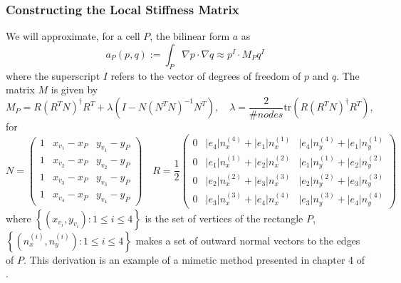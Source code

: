 \subsubsection{Constructing the Local Stiffness Matrix}\label{Sec:NumericalScheme}
We will approximate, for a cell $P$, the bilinear form $a$ as
%
\begin{equation}
	a_P(p,q):=\int_P\nabla p\cdot\nabla q \approx p^I\cdot M_P q^I
\end{equation}
%
where the superscript $I$ refers to the vector of degrees of freedom of $p$ and $q$. The matrix $M$ is given by
%
\begin{equation}\label{eq:LocStiffnessMat}
	M_P = R(R^TN)^{\dagger}R^T+\lambda (I-N(N^TN)^{-1}N^T),\quad\lambda = \frac{2}{\# nodes}\mbox{tr}\left( R(R^TN)^{\dagger}R^T\right),
\end{equation}
%
for 
%
\begin{equation}\label{eq:NandR}
	N = \begin{pmatrix}
		1 & x_{v_1}-x_P & y_{v_1}-y_P\\ 
		1 & x_{v_2}-x_P & y_{v_2}-y_P\\ 
		1 & x_{v_3}-x_P & y_{v_3}-y_P\\ 
		1 & x_{v_4}-x_P & y_{v_4}-y_P
	\end{pmatrix}\quad
	R = \frac{1}{2}\begin{pmatrix}
		0 & |e_4| n_x^{(4)}+|e_1|n_x^{(1)} & |e_4| n_y^{(4)}+|e_1|n_y^{(1)}\\
		0 & |e_1| n_x^{(1)}+|e_2|n_x^{(2)} & |e_1| n_y^{(1)}+|e_2|n_y^{(2)}\\
		0 & |e_2| n_x^{(2)}+|e_3|n_x^{(3)} & |e_2| n_y^{(2)}+|e_3|n_y^{(3)}\\
		0 & |e_3| n_x^{(3)}+|e_4|n_x^{(4)} & |e_3| n_y^{(3)}+|e_4|n_y^{(4)}
	\end{pmatrix}
\end{equation}
%
where $\left\{\left(x_{v_i},y_{v_i}\right):1\le i\le 4\right\}$ is the set of vertices of the rectangle $P$, $\left\{\left(n_x^{(i)},n_y^{(i)}\right):1\le i\le 4\right\}$ makes a set of outward normal vectors to the edges of $P$. 
%
This derivation is an example of a mimetic method presented in chapter 4 of \cite{da2014mimetic}.
%
